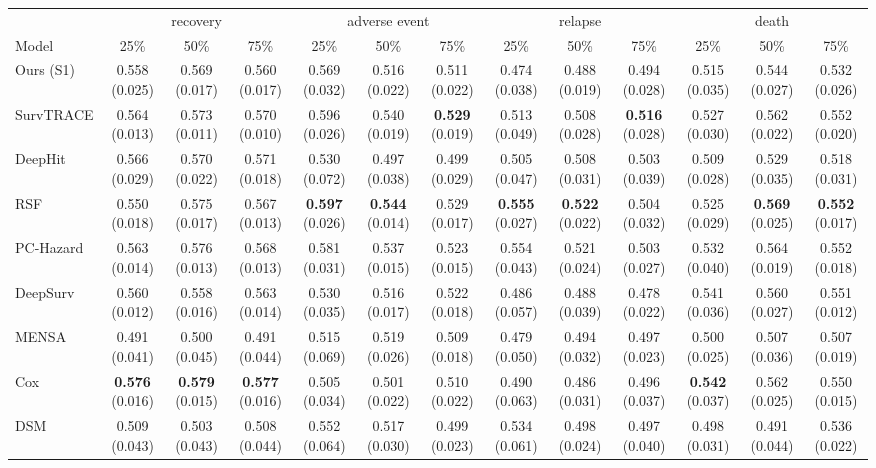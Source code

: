 \begin{tabular}{lcccccccccccc}
\toprule
 & \multicolumn{3}{c}{recovery} & \multicolumn{3}{c}{adverse event} & \multicolumn{3}{c}{relapse} & \multicolumn{3}{c}{death} \\
Model & 25\% & 50\% & 75\% & 25\% & 50\% & 75\% & 25\% & 50\% & 75\% & 25\% & 50\% & 75\% \\
\midrule
Ours (S1) & 0.558 (0.025) & 0.569 (0.017) & 0.560 (0.017) & 0.569 (0.032) & 0.516 (0.022) & 0.511 (0.022) & 0.474 (0.038) & 0.488 (0.019) & 0.494 (0.028) & 0.515 (0.035) & 0.544 (0.027) & 0.532 (0.026) \\
SurvTRACE & 0.564 (0.013) & 0.573 (0.011) & 0.570 (0.010) & 0.596 (0.026) & 0.540 (0.019) & \textbf{0.529} (0.019) & 0.513 (0.049) & 0.508 (0.028) & \textbf{0.516} (0.028) & 0.527 (0.030) & 0.562 (0.022) & 0.552 (0.020) \\
DeepHit & 0.566 (0.029) & 0.570 (0.022) & 0.571 (0.018) & 0.530 (0.072) & 0.497 (0.038) & 0.499 (0.029) & 0.505 (0.047) & 0.508 (0.031) & 0.503 (0.039) & 0.509 (0.028) & 0.529 (0.035) & 0.518 (0.031) \\
RSF & 0.550 (0.018) & 0.575 (0.017) & 0.567 (0.013) & \textbf{0.597} (0.026) & \textbf{0.544} (0.014) & 0.529 (0.017) & \textbf{0.555} (0.027) & \textbf{0.522} (0.022) & 0.504 (0.032) & 0.525 (0.029) & \textbf{0.569} (0.025) & \textbf{0.552} (0.017) \\
PC-Hazard & 0.563 (0.014) & 0.576 (0.013) & 0.568 (0.013) & 0.581 (0.031) & 0.537 (0.015) & 0.523 (0.015) & 0.554 (0.043) & 0.521 (0.024) & 0.503 (0.027) & 0.532 (0.040) & 0.564 (0.019) & 0.552 (0.018) \\
DeepSurv & 0.560 (0.012) & 0.558 (0.016) & 0.563 (0.014) & 0.530 (0.035) & 0.516 (0.017) & 0.522 (0.018) & 0.486 (0.057) & 0.488 (0.039) & 0.478 (0.022) & 0.541 (0.036) & 0.560 (0.027) & 0.551 (0.012) \\
MENSA & 0.491 (0.041) & 0.500 (0.045) & 0.491 (0.044) & 0.515 (0.069) & 0.519 (0.026) & 0.509 (0.018) & 0.479 (0.050) & 0.494 (0.032) & 0.497 (0.023) & 0.500 (0.025) & 0.507 (0.036) & 0.507 (0.019) \\
Cox & \textbf{0.576} (0.016) & \textbf{0.579} (0.015) & \textbf{0.577} (0.016) & 0.505 (0.034) & 0.501 (0.022) & 0.510 (0.022) & 0.490 (0.063) & 0.486 (0.031) & 0.496 (0.037) & \textbf{0.542} (0.037) & 0.562 (0.025) & 0.550 (0.015) \\
DSM & 0.509 (0.043) & 0.503 (0.043) & 0.508 (0.044) & 0.552 (0.064) & 0.517 (0.030) & 0.499 (0.023) & 0.534 (0.061) & 0.498 (0.024) & 0.497 (0.040) & 0.498 (0.031) & 0.491 (0.044) & 0.536 (0.022) \\
\bottomrule
\end{tabular}
